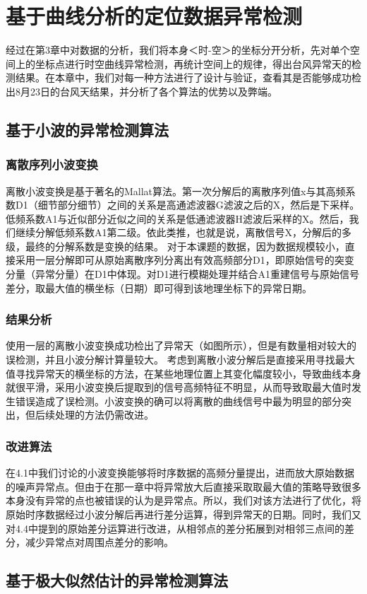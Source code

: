 \documentclass[a4paper,AutoFakeBold,oneside,12pt]{book}
\begin{document}
{{\chapter{基于曲线分析的定位数据异常检测}
经过在第3章中对数据的分析，我们将本身＜时-空＞的坐标分开分析，先对单个空间上的坐标点进行时空曲线异常检测，再统计空间上的规律，得出台风异常天的检测结果。在本章中，我们对每一种方法进行了设计与验证，查看其是否能够成功检出8月23日的台风天结果，并分析了各个算法的优势以及弊端。

\section{基于小波的异常检测算法}
\subsection{离散序列小波变换}
离散小波变换是基于著名的Mallat算法。第一次分解后的离散序列值x与其高频系数D1（细节部分细节）之间的关系是高通滤波器G滤波之后的X，然后是下采样。低频系数A1与近似部分近似之间的关系是低通滤波器H滤波后采样的X。然后，我们继续分解低频系数A1第二级。依此类推，也就是说，离散信号X，分解后的多级，最终的分解系数是变换的结果。
	对于本课题的数据，因为数据规模较小，直接采用一层分解即可从原始离散序列分离出有效高频部分D1，即原始信号的突变分量（异常分量）在D1中体现。对D1进行模糊处理并结合A1重建信号与原始信号差分，取最大值的横坐标（日期）即可得到该地理坐标下的异常日期。
\subsection{结果分析}
使用一层的离散小波变换成功检出了异常天（如图所示），但是有数量相对较大的误检测，并且小波分解计算量较大。
	考虑到离散小波分解后是直接采用寻找最大值寻找异常天的横坐标的方法，在某些地理位置上其变化幅度较小，导致曲线本身就很平滑，采用小波变换后提取到的信号高频特征不明显，从而导致取最大值时发生错误造成了误检测。小波变换的确可以将离散的曲线信号中最为明显的部分突出，但后续处理的方法仍需改进。
\subsection{改进算法}
在4.1中我们讨论的小波变换能够将时序数据的高频分量提出，进而放大原始数据的噪声异常点。但由于在那一章中将异常放大后直接采取取最大值的策略导致很多本身没有异常的点也被错误的认为是异常点。所以，我们对该方法进行了优化，将原始时序数据经过小波分解后再进行差分运算，得到异常天的日期。同时，我们又对4.4中提到的原始差分运算进行改进，从相邻点的差分拓展到对相邻三点间的差分，减少异常点对周围点差分的影响。
\section{基于极大似然估计的异常检测算法}
}}
\end{document}
